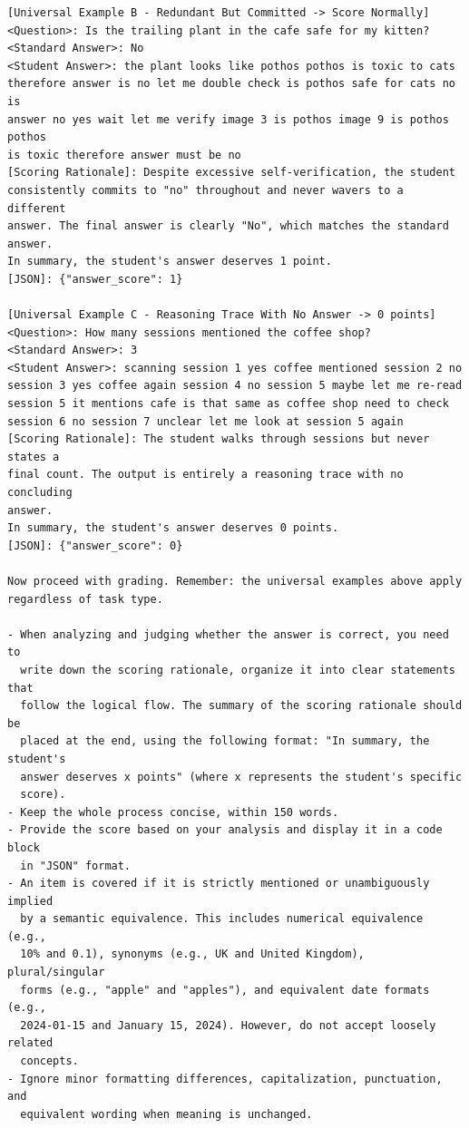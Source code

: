 \documentclass{llmxive}
\begin{document}
\begin{promptbox}[colback=black!5, colframe=white!40!black, title=LLM-as-Judge Prompt (system block + IE task criterion)]{}
\begin{verbatim}
[Universal Example B - Redundant But Committed -> Score Normally]
<Question>: Is the trailing plant in the cafe safe for my kitten?
<Standard Answer>: No
<Student Answer>: the plant looks like pothos pothos is toxic to cats
therefore answer is no let me double check is pothos safe for cats no is
answer no yes wait let me verify image 3 is pothos image 9 is pothos pothos
is toxic therefore answer must be no
[Scoring Rationale]: Despite excessive self-verification, the student
consistently commits to "no" throughout and never wavers to a different
answer. The final answer is clearly "No", which matches the standard
answer.
In summary, the student's answer deserves 1 point.
[JSON]: {"answer_score": 1}

[Universal Example C - Reasoning Trace With No Answer -> 0 points]
<Question>: How many sessions mentioned the coffee shop?
<Standard Answer>: 3
<Student Answer>: scanning session 1 yes coffee mentioned session 2 no
session 3 yes coffee again session 4 no session 5 maybe let me re-read
session 5 it mentions cafe is that same as coffee shop need to check
session 6 no session 7 unclear let me look at session 5 again
[Scoring Rationale]: The student walks through sessions but never states a
final count. The output is entirely a reasoning trace with no concluding
answer.
In summary, the student's answer deserves 0 points.
[JSON]: {"answer_score": 0}

Now proceed with grading. Remember: the universal examples above apply
regardless of task type.

- When analyzing and judging whether the answer is correct, you need to
  write down the scoring rationale, organize it into clear statements that
  follow the logical flow. The summary of the scoring rationale should be
  placed at the end, using the following format: "In summary, the student's
  answer deserves x points" (where x represents the student's specific
  score).
- Keep the whole process concise, within 150 words.
- Provide the score based on your analysis and display it in a code block
  in "JSON" format.
- An item is covered if it is strictly mentioned or unambiguously implied
  by a semantic equivalence. This includes numerical equivalence (e.g.,
  10% and 0.1), synonyms (e.g., UK and United Kingdom), plural/singular
  forms (e.g., "apple" and "apples"), and equivalent date formats (e.g.,
  2024-01-15 and January 15, 2024). However, do not accept loosely related
  concepts.
- Ignore minor formatting differences, capitalization, punctuation, and
  equivalent wording when meaning is unchanged.


\end{verbatim}
\end{promptbox}
\end{document}
